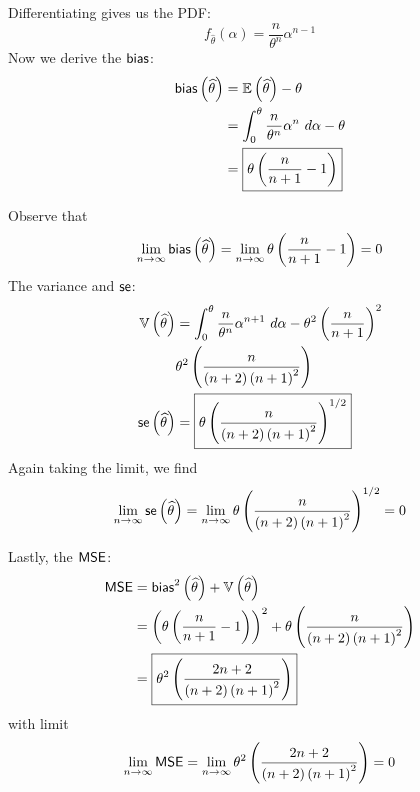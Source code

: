 \documentclass[a4paper]{article}
\begin{document}
Differentiating gives us the \textsf{PDF}:
\[
	f_{\widehat{\theta}}\left( \alpha  \right) = \frac{n}{\theta^{n}} \alpha^{n-1}
\]
Now we derive the \(\operatorname{\textsf{bias}} \):
\begin{align*}
	\operatorname{\textsf{bias}} \left( \widehat{\theta} \right)  & = \mathbb{E}\left( \widehat{\theta} \right) - \theta \\
	 & = \int^{\theta}_{0} \frac{n}{\theta^{n}} \alpha^{n} \ d \alpha - \theta \\ 
	 & = \boxed{\theta \left( \frac{n}{n+1} - 1 \right)}
\end{align*} 

Observe that
\[
	\lim_{n \to \infty} \operatorname{\textsf{bias}} \left( \widehat{\theta} \right) = \lim_{n \to \infty} \theta \left( \frac{n}{n+1} - 1 \right) = 0
\]
The variance and \(\operatorname{\textsf{se}}\):
\begin{align*}
	\mathbb{V}\left( \widehat{\theta} \right) & = \int^{\theta}_{0} \frac{n}{\theta^{n}} \alpha^{n+1} \ d \alpha - \theta^{2} \left( \frac{n}{n+1} \right)^{2}  \\
	 & \theta^{2} \left( \frac{n}{\left( n + 2 \right) \left( n + 1 \right)^{2}} \right)  \\
	\operatorname{\textsf{se}} \left( \widehat{\theta} \right) & = \boxed{\theta \left( \frac{n}{\left( n + 2 \right) \left( n + 1 \right)^{2}} \right)^{1/2}}
\end{align*}
Again taking the limit, we find
\[
	\lim_{n \to \infty} \operatorname{\textsf{se}} \left( \widehat{\theta} \right) = \lim_{n \to \infty} \theta \left( \frac{n}{\left( n + 2 \right) \left( n + 1 \right)^{2}} \right)^{1/2} = 0
\]

Lastly, the \(\operatorname{\textsf{MSE}} \):
\begin{align*}
	\operatorname{\textsf{MSE}}  & = \operatorname{\textsf{bias}}^{2} \left( \widehat{\theta} \right) + \mathbb{V}\left( \widehat{\theta} \right) \\
	 & = \left( \theta \left( \frac{n}{n+1} - 1 \right)  \right)^{2} + \theta \left( \frac{n}{\left( n + 2 \right) \left( n + 1 \right)^{2}} \right)  \\ 
	 & = \boxed{\theta^{2} \left( \frac{2n + 2}{\left( n + 2 \right) \left( n + 1 \right)^{2}} \right) }
\end{align*}
with limit
\[
	\lim_{n \to \infty} \operatorname{\textsf{MSE}} = \lim_{n \to \infty} \theta^{2} \left( \frac{2n + 2}{\left( n + 2 \right) \left( n + 1 \right)^{2}} \right) = 0
\]

\end{document}
